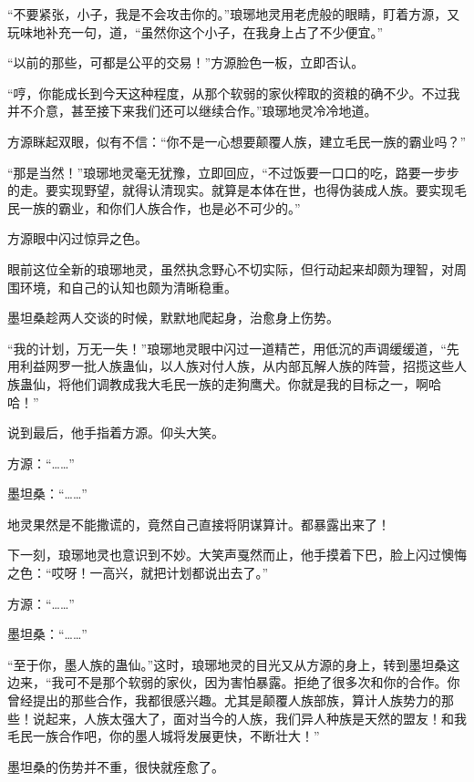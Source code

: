 
\begin{this_body}

“不要紧张，小子，我是不会攻击你的。”琅琊地灵用老虎般的眼睛，盯着方源，又玩味地补充一句，道，“虽然你这个小子，在我身上占了不少便宜。”

“以前的那些，可都是公平的交易！”方源脸色一板，立即否认。

“哼，你能成长到今天这种程度，从那个软弱的家伙榨取的资粮的确不少。不过我并不介意，甚至接下来我们还可以继续合作。”琅琊地灵冷冷地道。

方源眯起双眼，似有不信：“你不是一心想要颠覆人族，建立毛民一族的霸业吗？”

“那是当然！”琅琊地灵毫无犹豫，立即回应，“不过饭要一口口的吃，路要一步步的走。要实现野望，就得认清现实。就算是本体在世，也得伪装成人族。要实现毛民一族的霸业，和你们人族合作，也是必不可少的。”

方源眼中闪过惊异之色。

眼前这位全新的琅琊地灵，虽然执念野心不切实际，但行动起来却颇为理智，对周围环境，和自己的认知也颇为清晰稳重。

墨坦桑趁两人交谈的时候，默默地爬起身，治愈身上伤势。

“我的计划，万无一失！”琅琊地灵眼中闪过一道精芒，用低沉的声调缓缓道，“先用利益网罗一批人族蛊仙，以人族对付人族，从内部瓦解人族的阵营，招揽这些人族蛊仙，将他们调教成我大毛民一族的走狗鹰犬。你就是我的目标之一，啊哈哈！”

说到最后，他手指着方源。仰头大笑。

方源：“……”

墨坦桑：“……”

地灵果然是不能撒谎的，竟然自己直接将阴谋算计。都暴露出来了！

下一刻，琅琊地灵也意识到不妙。大笑声戛然而止，他手摸着下巴，脸上闪过懊悔之色：“哎呀！一高兴，就把计划都说出去了。”

方源：“……”

墨坦桑：“……”

“至于你，墨人族的蛊仙。”这时，琅琊地灵的目光又从方源的身上，转到墨坦桑这边来，“我可不是那个软弱的家伙，因为害怕暴露。拒绝了很多次和你的合作。你曾经提出的那些合作，我都很感兴趣。尤其是颠覆人族部族，算计人族势力的那些！说起来，人族太强大了，面对当今的人族，我们异人种族是天然的盟友！和我毛民一族合作吧，你的墨人城将发展更快，不断壮大！”

墨坦桑的伤势并不重，很快就痊愈了。


\end{this_body}
